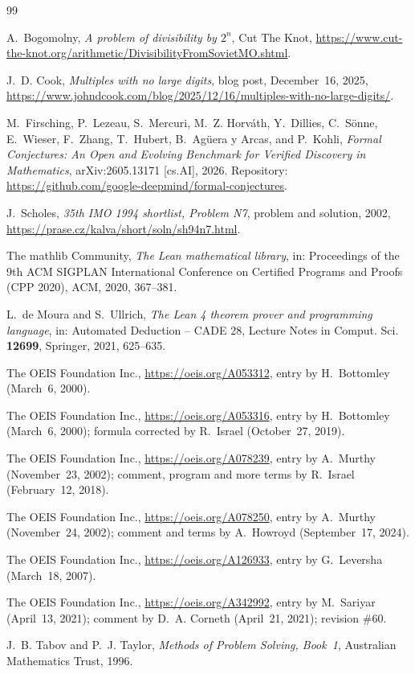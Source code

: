 \documentclass[11pt]{amsart}
\theoremstyle{plain}
\theoremstyle{definition}
\begin{document}
{\small\raggedright
\begin{thebibliography}{99}

A.~Bogomolny, \emph{A problem of divisibility by $2^n$}, Cut The Knot, \url{https://www.cut-the-knot.org/arithmetic/DivisibilityFromSovietMO.shtml}.

J.~D. Cook, \emph{Multiples with no large digits}, blog post, December~16, 2025, \url{https://www.johndcook.com/blog/2025/12/16/multiples-with-no-large-digits/}.

M.~Firsching, P.~Lezeau, S.~Mercuri, M.~Z. Horv\'ath, Y.~Dillies, C.~S\"onne, E.~Wieser, F.~Zhang, T.~Hubert, B.~Ag\"uera y Arcas, and P.~Kohli, \emph{Formal Conjectures: An Open and Evolving Benchmark for Verified Discovery in Mathematics}, arXiv:2605.13171 [cs.AI], 2026. Repository: \url{https://github.com/google-deepmind/formal-conjectures}.

J.~Scholes, \emph{35th IMO 1994 shortlist, Problem N7}, problem and solution, 2002, \url{https://prase.cz/kalva/short/soln/sh94n7.html}.

The mathlib Community, \emph{The Lean mathematical library}, in: Proceedings of the 9th ACM SIGPLAN International Conference on Certified Programs and Proofs (CPP 2020), ACM, 2020, 367--381.

L.~de Moura and S.~Ullrich, \emph{The Lean 4 theorem prover and programming language}, in: Automated Deduction -- CADE 28, Lecture Notes in Comput. Sci. \textbf{12699}, Springer, 2021, 625--635.

The OEIS Foundation Inc., \url{https://oeis.org/A053312}, entry by H.~Bottomley (March~6, 2000).

The OEIS Foundation Inc., \url{https://oeis.org/A053316}, entry by H.~Bottomley (March~6, 2000); formula corrected by R.~Israel (October~27, 2019).

The OEIS Foundation Inc., \url{https://oeis.org/A078239}, entry by A.~Murthy (November~23, 2002); comment, program and more terms by R.~Israel (February~12, 2018).

The OEIS Foundation Inc., \url{https://oeis.org/A078250}, entry by A.~Murthy (November~24, 2002); comment and terms by A.~Howroyd (September~17, 2024).

The OEIS Foundation Inc., \url{https://oeis.org/A126933}, entry by G.~Leversha (March~18, 2007).

The OEIS Foundation Inc., \url{https://oeis.org/A342992}, entry by M.~Sariyar (April~13, 2021); comment by D.~A. Corneth (April~21, 2021); revision \#60.

J.~B. Tabov and P.~J. Taylor, \emph{Methods of Problem Solving, Book~1}, Australian Mathematics Trust, 1996.

\end{thebibliography}
}
\end{document}

